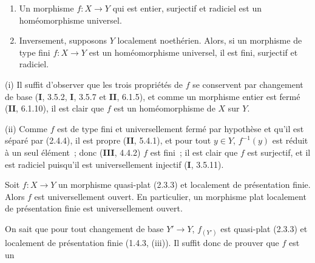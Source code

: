 \begin{proposition}[2.4.5]
\begin{enumerate}
\item[\textup{(i)}] Un morphisme $f:X\to Y$ qui est entier, surjectif et radiciel est
un homéomorphisme universel.
\item[\textup{(ii)}] Inversement, supposons $Y$ localement noethérien. Alors, si un
morphisme de type fini $f:X\to Y$ est un homéomorphisme universel, il est
fini, surjectif et radiciel.
\end{enumerate}
\end{proposition}

(i) Il suffit d'observer que les trois propriétés de $f$ se conservent par
changement de base (\textbf{I}, 3.5.2, \textbf{I}, 3.5.7 et \textbf{II}, 6.1.5), et comme un morphisme
entier est fermé (\textbf{II}, 6.1.10), il est clair que $f$ est un homéomorphisme de
$X$ sur $Y$.

(ii) Comme $f$ est de type fini et universellement fermé par hypothèse et
qu'il est séparé par (2.4.4), il est propre (\textbf{II}, 5.4.1), et pour tout
$y\in Y$, $f^{-1}(y)$ est réduit à un seul élément~; donc (\textbf{III}, 4.4.2) $f$
est fini~; il est clair que $f$ est surjectif, et il est radiciel puisqu'il
est universellement injectif (\textbf{I}, 3.5.11).

\begin{theorem}[2.4.6]
\label{IV.2.4.6-fr}
Soit $f:X\to Y$ un morphisme quasi-plat \textup{(2.3.3)} et localement de présentation
finie. Alors $f$ est universellement ouvert. En particulier, un morphisme plat
localement de présentation finie est universellement ouvert.
\end{theorem}

On sait que pour tout changement de base $Y'\to Y$, $f_{(Y')}$ est
quasi-plat (2.3.3) et localement de présentation finie (1.4.3, (iii)). Il
suffit donc de prouver que $f$ est un
